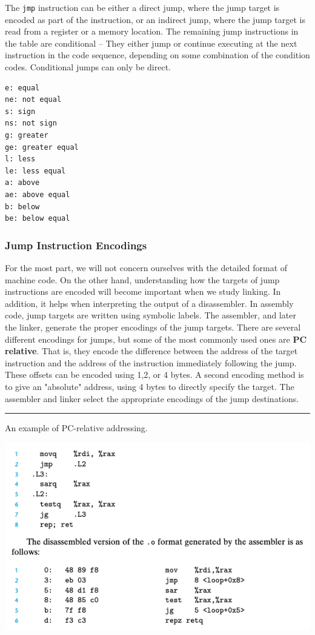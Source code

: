 \documentclass[11pt]{article}
\begin{document}
The \texttt{jmp} instruction can be either a direct jump, where the jump target is encoded as part of the instruction, or an indirect jump, where the jump target is read from a register or a memory location. The remaining jump instructions in the table are conditional -- They either jump or continue executing at the next instruction in the code sequence, depending on some combination of the condition codes. Conditional jumps can only be direct.\\

\begin{verbatim}
e: equal
ne: not equal
s: sign
ns: not sign
g: greater
ge: greater equal
l: less
le: less equal
a: above
ae: above equal
b: below
be: below equal
\end{verbatim}

\subsubsection{Jump Instruction Encodings}
\label{sec:orgbf3a309}
For the most part, we will not concern ourselves with the detailed format of machine code. On the other hand, understanding how the targets of jump instructions are encoded will become important when we study linking. In addition, it helps when interpreting the output of a disassembler. In assembly code, jump targets are written using symbolic labels. The assembler, and later the linker, generate the proper encodings of the jump targets. There are several different encodings for jumps, but some of the most commonly used ones are \textbf{PC relative}. That is, they encode the difference between the address of the target instruction and the address of the instruction immediately following the jump. These offsets can be encoded using 1,2, or 4 bytes. A second encoding method is to give an "absolute" address, using 4 bytes to directly specify the target. The assembler and linker select the appropriate encodings of the jump destinations.\\


\noindent\rule{\textwidth}{0.5pt}
An example of PC-relative addressing.\\

\begin{center}
\includegraphics[width=.9\linewidth]{pics/pc-relative-addressing.png}
\end{center}
\end{document}
